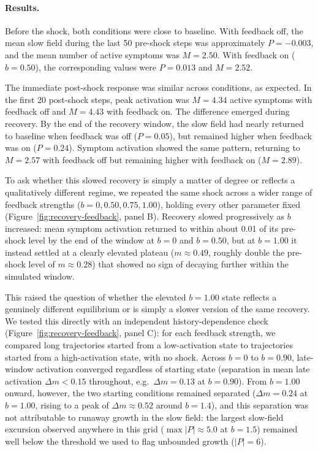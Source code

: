 \paragraph{Results.}
Before the shock, both conditions were close to baseline. With feedback off,
the mean slow field during the last 50 pre-shock steps was approximately
\(P=-0.003\), and the mean number of active symptoms was \(M=2.50\). With
feedback on (\(b=0.50\)), the corresponding values were \(P=0.013\) and
\(M=2.52\).

The immediate post-shock response was similar across conditions, as expected.
In the first 20 post-shock steps, peak activation was \(M=4.34\) active
symptoms with feedback off and \(M=4.43\) with feedback on. The difference
emerged during recovery. By the end of the recovery window, the slow field had
nearly returned to baseline when feedback was off (\(P=0.05\)), but remained
higher when feedback was on (\(P=0.24\)). Symptom activation showed the same
pattern, returning to \(M=2.57\) with feedback off but remaining higher with
feedback on (\(M=2.89\)).

To ask whether this slowed recovery is simply a matter of degree or reflects a
qualitatively different regime, we repeated the same shock across a wider
range of feedback strengths (\(b=0, 0.50, 0.75, 1.00\)), holding every other
parameter fixed (Figure~\ref{fig:recovery-feedback}, panel B). Recovery
slowed progressively as \(b\) increased: mean symptom activation returned to
within about 0.01 of its pre-shock level by the end of the window at
\(b=0\) and \(b=0.50\), but at \(b=1.00\) it instead settled at a clearly
elevated plateau (\(m\approx0.49\), roughly double the pre-shock level of
\(m\approx0.28\)) that showed no sign of decaying further within the
simulated window.

This raised the question of whether the elevated \(b=1.00\) state reflects a
genuinely different equilibrium or is simply a slower version of the same
recovery. We tested this directly with an independent history-dependence
check (Figure~\ref{fig:recovery-feedback}, panel C): for each feedback
strength, we compared long trajectories started from a low-activation state to
trajectories started from a high-activation state, with no shock. Across
\(b=0\) to \(b=0.90\), late-window activation converged regardless of starting
state (separation in mean late activation \(\Delta m<0.15\) throughout, e.g.\
\(\Delta m=0.13\) at \(b=0.90\)). From \(b=1.00\) onward, however, the two
starting conditions remained separated (\(\Delta m=0.24\) at \(b=1.00\),
rising to a peak of \(\Delta m\approx0.52\) around \(b=1.4\)), and this
separation was not attributable to runaway growth in the slow field: the
largest slow-field excursion observed anywhere in this grid
(\(\max|P|\approx5.0\) at \(b=1.5\)) remained well below the threshold we used
to flag unbounded growth (\(|P|=6\)).


